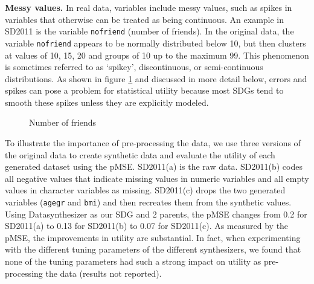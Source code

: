 \documentclass[runningheads]{llncs}
\begin{document}
{\bf Messy values.} In real data, variables include messy values, such as spikes in variables that otherwise can be treated as being continuous.  An example in SD2011 is the variable \texttt{nofriend} (number of friends).  In the original data, the variable \texttt{nofriend} appears to be normally distributed below 10, but then clusters at values of 10, 15, 20 and groups of 10 up to the maximum 99.  This phenomenon is sometimes referred to as `spikey', discontinuous, or semi-continuous distributions.  As shown in figure \ref{fig:graph_datasynthesizer_nofriend} and discussed in more detail below, errors and spikes can pose a problem for statistical utility because most SDGs tend to smooth these spikes unless they are explicitly modeled.

\begin{figure}[ht!]
    \centering        
    \caption{Number of friends}
    \label{fig:graph_datasynthesizer_nofriend}
\end{figure}

To illustrate the importance of pre-processing the data, we use three versions of the original data to create synthetic data and evaluate the utility of each generated dataset using the pMSE.  SD2011(a) is the raw data.  SD2011(b) codes all negative values that indicate missing values in numeric variables and all empty values in character variables as missing.  SD2011(c) drops the two generated variables (\texttt{agegr} and \texttt{bmi}) and then recreates them from the synthetic values. Using Datasynthesizer as our SDG and 2 parents, the pMSE changes from 0.2 for SD2011(a) to 0.13 for SD2011(b) to 0.07 for SD2011(c). As measured by the pMSE, the improvements in utility are substantial. In fact, when experimenting with the different tuning parameters of the different synthesizers, we found that none of the tuning parameters had such a strong impact on utility as pre-processing the data (results not reported).   
\end{document}
